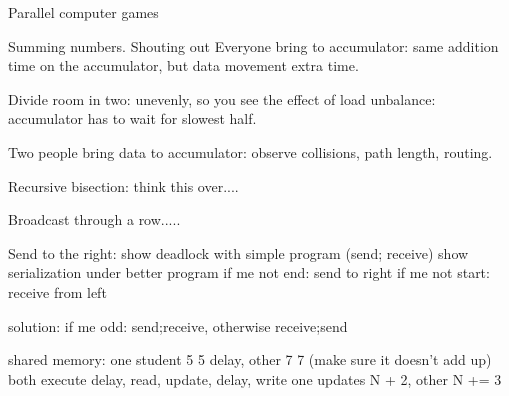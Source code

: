  {Parallel computer games}

Summing numbers.
Shouting out
Everyone bring to accumulator: same addition time on the accumulator,
but data movement extra time.

Divide room in two: unevenly, so you see the effect of load unbalance:
accumulator has to wait for slowest half.

Two people bring data to accumulator: observe collisions, path length,
routing.

Recursive bisection: think this over....

Broadcast through a row.....

Send to the right: show deadlock with simple program (send; receive)
show serialization under better program
if me not end: send to right
if me not start: receive from left

solution: if me odd: send;receive, otherwise receive;send

shared memory:
one student 5 5 delay, other 7 7 (make sure it doesn't add up)
both execute delay, read, update, delay, write
one updates N + 2, other N += 3

